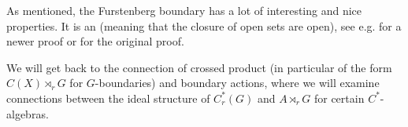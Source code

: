 As mentioned, the Furstenberg boundary has a lot of interesting and nice properties. It is an  (meaning that the closure of open sets are open), see e.g. \cite[Proposition 2.4]{breuillard2017c} for a newer proof or \cite[4.18]{hamana1979injective} for the original proof.

We will get back to the connection of crossed product (in particular of the form $C(X) \rtimes_r G$ for $G$-boundaries) and boundary actions, where we will examine connections between the ideal structure of $C_r^*(G)$ and $A \rtimes_r G$ for certain $C^*$-algebras.
